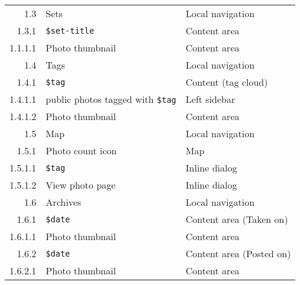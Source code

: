 \documentclass[11pt,a4paper]{article}
\newcommand{\var}[1]{\texttt{\${#1}}}
\begin{document}
\begin{table}[h!b!p!]
\begin{center}
\begin{small}
\begin{tabular}{|r|l|l|}
              1.3 &
              Sets &
              Local navigation \\

                1.3.1 &
                \var{set-title} &
                Content area \\

                  1.1.1.1 &
                  Photo thumbnail &
                  Content area \\


              1.4 &
              Tags &
              Local navigation \\

                1.4.1 &
                \var{tag} &
                Content (tag cloud) \\

                  1.4.1.1 &
                  public photos tagged with \var{tag} &
                  Left sidebar \\

                  1.4.1.2 &
                  Photo thumbnail &
                  Content area \\


              1.5 &
              Map &
              Local navigation \\

                1.5.1 &
                Photo count icon &
                Map \\

                  1.5.1.1 &
                  \var{tag} &
                  Inline dialog \\

                  1.5.1.2 &
                  View photo page &
                  Inline dialog \\

              1.6 &
              Archives &
              Local navigation \\

                1.6.1 &
                \var{date} &
                Content area (Taken on) \\

                  1.6.1.1 &
                  Photo thumbnail &
                  Content area \\

                1.6.2 &
                \var{date} &
                Content area (Posted on) \\

                  1.6.2.1 &
                  Photo thumbnail &
                  Content area \\


\end{tabular}
\end{small}
\end{center}
\end{table}
\end{document}
